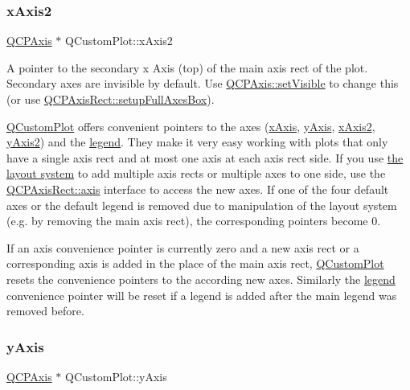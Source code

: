 \subsubsection{\texorpdfstring{x\+Axis2}{xAxis2}}
{\footnotesize\ttfamily \hyperlink{class_q_c_p_axis}{Q\+C\+P\+Axis} $\ast$ Q\+Custom\+Plot\+::x\+Axis2}

A pointer to the secondary x Axis (top) of the main axis rect of the plot. Secondary axes are invisible by default. Use \hyperlink{class_q_c_p_layerable_a3bed99ddc396b48ce3ebfdc0418744f8}{Q\+C\+P\+Axis\+::set\+Visible} to change this (or use \hyperlink{class_q_c_p_axis_rect_a5fa906175447b14206954f77fc7f1ef4}{Q\+C\+P\+Axis\+Rect\+::setup\+Full\+Axes\+Box}).

\hyperlink{class_q_custom_plot}{Q\+Custom\+Plot} offers convenient pointers to the axes (\hyperlink{class_q_custom_plot_a9a79cd0158a4c7f30cbc702f0fd800e4}{x\+Axis}, \hyperlink{class_q_custom_plot_af6fea5679725b152c14facd920b19367}{y\+Axis}, \hyperlink{class_q_custom_plot_ada41599f22cad901c030f3dcbdd82fd9}{x\+Axis2}, \hyperlink{class_q_custom_plot_af13fdc5bce7d0fabd640f13ba805c0b7}{y\+Axis2}) and the \hyperlink{class_q_custom_plot_a4eadcd237dc6a09938b68b16877fa6af}{legend}. They make it very easy working with plots that only have a single axis rect and at most one axis at each axis rect side. If you use \hyperlink{}{the layout system} to add multiple axis rects or multiple axes to one side, use the \hyperlink{class_q_c_p_axis_rect_a583ae4f6d78b601b732183f6cabecbe1}{Q\+C\+P\+Axis\+Rect\+::axis} interface to access the new axes. If one of the four default axes or the default legend is removed due to manipulation of the layout system (e.\+g. by removing the main axis rect), the corresponding pointers become 0.

If an axis convenience pointer is currently zero and a new axis rect or a corresponding axis is added in the place of the main axis rect, \hyperlink{class_q_custom_plot}{Q\+Custom\+Plot} resets the convenience pointers to the according new axes. Similarly the \hyperlink{class_q_custom_plot_a4eadcd237dc6a09938b68b16877fa6af}{legend} convenience pointer will be reset if a legend is added after the main legend was removed before. \mbox{\label{class_q_custom_plot_af6fea5679725b152c14facd920b19367}} 
\subsubsection{\texorpdfstring{y\+Axis}{yAxis}}
{\footnotesize\ttfamily \hyperlink{class_q_c_p_axis}{Q\+C\+P\+Axis} $\ast$ Q\+Custom\+Plot\+::y\+Axis}

